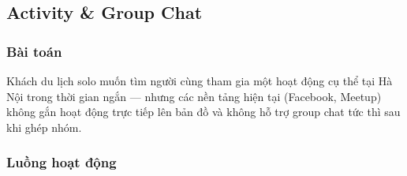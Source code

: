\documentclass[12pt,a4paper]{article}
\begin{document}
\subsection{Activity \& Group Chat}

\subsubsection{Bài toán}

Khách du lịch solo muốn tìm người cùng tham gia một hoạt động cụ thể tại Hà
Nội trong thời gian ngắn --- nhưng các nền tảng hiện tại (Facebook, Meetup)
không gắn hoạt động trực tiếp lên bản đồ và không hỗ trợ group chat tức thì
sau khi ghép nhóm.

\subsubsection{Luồng hoạt động}
\end{document}
